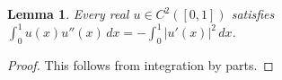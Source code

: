 \documentclass{article}
\newtheorem{lemma}{Lemma}
\begin{document}
\begin{lemma}\label{lem:parts}
Every real $u\in C^2([0,1])$ satisfies
$\int_0^1 u(x)u''(x)\,dx=-\int_0^1 |u'(x)|^2\,dx$.
\end{lemma}
\begin{proof}
This follows from integration by parts.
\end{proof}
\end{document}
